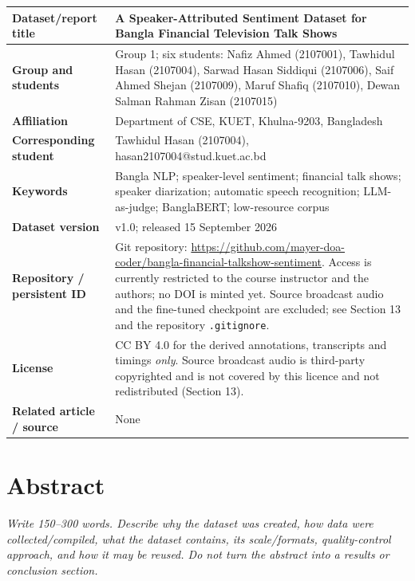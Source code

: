 \documentclass[11pt,a4paper]{article}
\newcommand{\thd}[1]{\textbf{\sffamily\small #1}}          %
\begin{document}
\begin{tabularx}{\textwidth}{|L{4.2cm}|Y|}
\hline
\thd{Dataset/report title}  & A Speaker-Attributed Sentiment Dataset for Bangla Financial Television Talk Shows \\ \hline
\thd{Group and students}    & Group 1; six students: Nafiz Ahmed (2107001), Tawhidul Hasan (2107004), Sarwad Hasan Siddiqui (2107006), Saif Ahmed Shejan (2107009), Maruf Shafiq (2107010), Dewan Salman Rahman Zisan (2107015) \\ \hline
\thd{Affiliation}           & Department of CSE, KUET, Khulna-9203, Bangladesh \\ \hline
\thd{Corresponding student} & Tawhidul Hasan (2107004), hasan2107004@stud.kuet.ac.bd \\ \hline
\thd{Keywords}              & Bangla NLP; speaker-level sentiment; financial talk shows; speaker diarization; automatic speech recognition; LLM-as-judge; BanglaBERT; low-resource corpus \\ \hline
\thd{Dataset version}       & v1.0; released 15 September 2026 \\ \hline
\thd{Repository / persistent ID} & Git repository: {\scriptsize\url{https://github.com/mayer-doa-coder/bangla-financial-talkshow-sentiment}}. Access is currently restricted to the course instructor and the authors; no DOI is minted yet. Source broadcast audio and the fine-tuned checkpoint are excluded; see Section 13 and the repository \texttt{.gitignore}. \\ \hline
\thd{License}               & CC BY 4.0 for the derived annotations, transcripts and timings \emph{only}. Source broadcast audio is third-party copyrighted and is not covered by this licence and not redistributed (Section 13). \\ \hline
\thd{Related article / source} & None \\ \hline
\end{tabularx}

\section{Abstract}

\emph{\small Write 150--300 words. Describe why the dataset was created, how data were
collected/compiled, what the dataset contains, its scale/formats, quality-control approach, and
how it may be reused. Do not turn the abstract into a results or conclusion section.}
\end{document}
